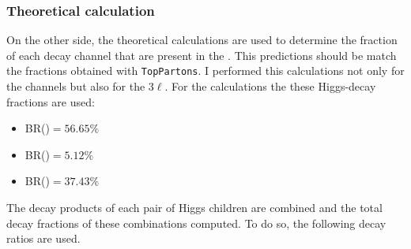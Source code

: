 
 

\subsubsection{Theoretical calculation}
\label{sec:ChaptH:Sig:truth:Calculations}
 On the other side, the theoretical calculations are used to determine the fraction of each decay channel that are present in the \dileptau. This predictions should be match the fractions obtained with \texttt{TopPartons}. I performed this 
calculations not only for the \dileptau channels but also for the $3\ell$. For the calculations the 
these Higgs-decay fractions are used:
\begin{itemize}
	\item  BR(\Htautau)$= 56.65\%$
	\item  BR(\HWW)$= 5.12\%$ 
	\item  BR(\ZZ)$= 37.43\%$
\end{itemize}
The decay products of each pair of Higgs children are combined and the total decay fractions of 
these combinations computed. To do so, the following decay ratios are used.

